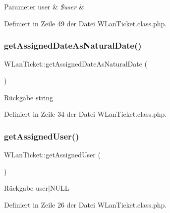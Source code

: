 \begin{DoxyParams}[1]{Parameter}
user & {\em \$user} & \\
\hline
\end{DoxyParams}


Definiert in Zeile 49 der Datei W\+Lan\+Ticket.\+class.\+php.

\mbox{\label{class_w_lan_ticket_a6ab549874600bde7ed6bd98535bca4f0}} 
\subsubsection{\texorpdfstring{get\+Assigned\+Date\+As\+Natural\+Date()}{getAssignedDateAsNaturalDate()}}
{\footnotesize\ttfamily W\+Lan\+Ticket\+::get\+Assigned\+Date\+As\+Natural\+Date (\begin{DoxyParamCaption}{ }\end{DoxyParamCaption})}

\begin{DoxyReturn}{Rückgabe}
string 
\end{DoxyReturn}


Definiert in Zeile 34 der Datei W\+Lan\+Ticket.\+class.\+php.

\mbox{\label{class_w_lan_ticket_a0b376222222574034aa6b8d693cfca04}} 
\subsubsection{\texorpdfstring{get\+Assigned\+User()}{getAssignedUser()}}
{\footnotesize\ttfamily W\+Lan\+Ticket\+::get\+Assigned\+User (\begin{DoxyParamCaption}{ }\end{DoxyParamCaption})}

\begin{DoxyReturn}{Rückgabe}
user$\vert$\+N\+U\+LL 
\end{DoxyReturn}


Definiert in Zeile 26 der Datei W\+Lan\+Ticket.\+class.\+php.

\mbox{\label{class_w_lan_ticket_af146240174a59a62da556497833675e3}} 
